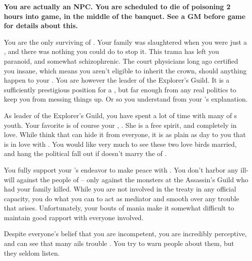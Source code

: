 \documentclass[char]{NeptuneBall}
\begin{document}
\name{\cPlant{}}

{\bf You are actually an NPC. You are scheduled to die of poisoning 2 hours into game, in the middle of the banquet.  See a GM before game for details about this.}

You are the only surviving \cPlant{\sibling} of \cKing{}. Your family was slaughtered when you were just a \cPlant{\kid}, and there was nothing you could do to stop it. This trama has left you paranoid, and somewhat schizophrenic. The court physicians long ago certified you insane, which means you aren't eligible to inherit the crown, should anything happen to your \cKing{\sibling}. You are however the leader of the Explorer's Guild. It is a sufficiently prestigious position for a \cPlant{\prince}, but far enough from any real politics to keep you from messing things up. Or so you understand from your \cKing{\sibling}'s explanation.

As leader of the Explorer's Guild, you have spent a lot of time with many of \pAtlantis{}s youth. Your favorite is of course your \cPrincess{\nephew}, \cPrincess{\prince} \cPrincess{}. She is a free spirit, and completely in love. While \cPrincess{\they} think that \cPrincess{\they} can hide it from everyone, it is as plain as day to you that \cPrincess{} is in love with \cDiplomat{}. You would like very much to see these two love birds married, and hang the political fall out if \cPrincess{} doesn't marry the \cPrince{\prince} of \pPacifica{}.

You fully support your \cKing{\sibling}'s endeavor to make peace with \pPacifica{}. You don't harbor any ill-will against the people of \pPacifica{} -- only against the monsters at the Assassin's Guild who had your family killed. While you are not involved in the treaty in any official capacity, you do what you can to act as mediator and smooth over any trouble that arises. Unfortunately, your bouts of mania make it somewhat difficult to maintain good rapport with everyone involved.

Despite everyone's belief that you are incompetent, you are incredibly perceptive, and can see that many ails trouble \pAtlantis{}. You try to warn people about them, but they seldom listen.
\end{document}
